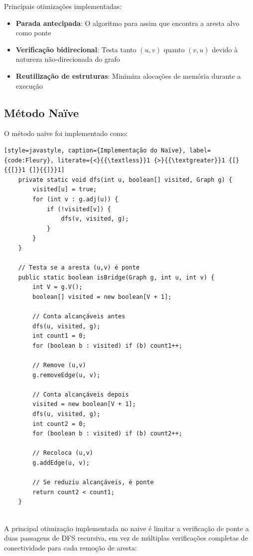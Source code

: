 \documentclass[12pt]{article}
\begin{document}
Principais otimizações implementadas:

\begin{itemize}
\item \textbf{Parada antecipada}: O algoritmo para assim que encontra a aresta alvo como ponte
\item \textbf{Verificação bidirecional}: Testa tanto $(u,v)$ quanto $(v,u)$ devido à natureza não-direcionada do grafo
\item \textbf{Reutilização de estruturas}: Minimiza alocações de memória durante a execução
\end{itemize}

\subsection{Método Naïve}

O método naïve foi implementado como:


\begin{lstlisting}[style=javastyle, caption={Implementação do Naïve}, label={code:Fleury}, literate={<}{{\textless}}1 {>}{{\textgreater}}1 {[}{{[}}1 {]}{{]}}1]
    private static void dfs(int u, boolean[] visited, Graph g) {
        visited[u] = true;
        for (int v : g.adj(u)) {
            if (!visited[v]) {
                dfs(v, visited, g);
            }
        }
    }

    // Testa se a aresta (u,v) é ponte
    public static boolean isBridge(Graph g, int u, int v) {
        int V = g.V();
        boolean[] visited = new boolean[V + 1];

        // Conta alcançáveis antes
        dfs(u, visited, g);
        int count1 = 0;
        for (boolean b : visited) if (b) count1++;

        // Remove (u,v)
        g.removeEdge(u, v);

        // Conta alcançáveis depois
        visited = new boolean[V + 1];
        dfs(u, visited, g);
        int count2 = 0;
        for (boolean b : visited) if (b) count2++;

        // Recoloca (u,v)
        g.addEdge(u, v);

        // Se reduziu alcançáveis, é ponte
        return count2 < count1;
    }


\end{lstlisting} 

A principal otimização implementada no naive é limitar a verificação de ponte a duas passagens de DFS recursiva, em vez de múltiplas verificações completas de conectividade para cada remoção de aresta:
\end{document}
